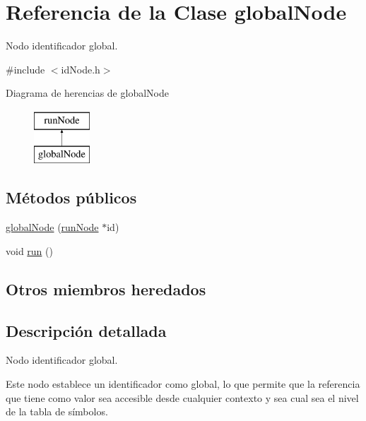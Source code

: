 \hypertarget{classglobalNode}{\section{Referencia de la Clase global\-Node}
\label{classglobalNode}
}


Nodo identificador global.  




{\ttfamily \#include $<$id\-Node.\-h$>$}

Diagrama de herencias de global\-Node\begin{figure}[H]
\begin{center}
\leavevmode
\includegraphics[height=2.000000cm]{classglobalNode}
\end{center}
\end{figure}
\subsection*{Métodos públicos}
\begin{DoxyCompactItemize}
\item 
\hyperlink{classglobalNode_a30486dc4cbebff694c840da941f84f7e}{global\-Node} (\hyperlink{classrunNode}{run\-Node} $\ast$id)
\item 
void \hyperlink{classglobalNode_afe7ecb283fb3c4dec0983aff20cbf214}{run} ()
\end{DoxyCompactItemize}
\subsection*{Otros miembros heredados}


\subsection{Descripción detallada}
Nodo identificador global. 

Este nodo establece un identificador como global, lo que permite que la referencia que tiene como valor sea accesible desde cualquier contexto y sea cual sea el nivel de la tabla de símbolos. 

